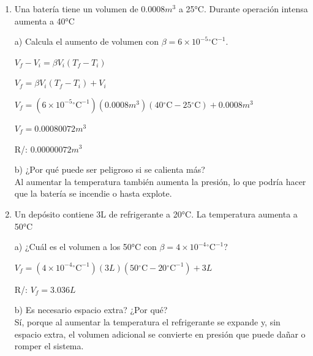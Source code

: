 \documentclass[a4paper, 11pt]{article}
\newcommand{\Pspace}{0.5cm}
\newcommand{\Aspace}{0.2cm}
\begin{document}
\begin{enumerate}
    \vspace{\Pspace}
    \item Una batería tiene un volumen de 0.0008$m^{3}$ a 25°C. Durante operación intensa aumenta a 40°C \par
        \vspace{\Aspace} \par
        a) Calcula el aumento de volumen con $\beta = 6 \times 10^{-5}\mathrm{^\circ C^{-1}}$.
        \\ { \color{azul} 
            $V_{f} - V_{i} = \beta V_{i} (T_{f} - T_{i})$ \par
            $V_{f} = \beta V_{i} (T_{f} - T_{i}) + V_{i}$ \par
            $V_{f} = (6 \times 10^{-5}\mathrm{^\circ C^{-1}})(0.0008m^{3})(40 \mathrm{^\circ C} - 25 \mathrm{^\circ C}) + 0.0008m^{3}$ \par
            $V_{f} = 0.00080072m^{3}$ \par
            R/: $0.00000072m^3$
        }

        \vspace{\Aspace} \par
        b) ¿Por qué puede ser peligroso si se calienta más?
        \\ { \color{azul} 
            Al aumentar la temperatura también aumenta la presión, lo que podría hacer que la batería se incendie o hasta explote.
        }



    \vspace{\Pspace}
    \item Un depósito contiene 3L de refrigerante a 20°C. La temperatura aumenta a 50°C \par
        \vspace{\Aspace} \par
        a) ¿Cuál es el volumen a los 50°C con $\beta = 4 \times 10^{-4}\mathrm{^\circ C^{-1}}$?
        \\ { \color{azul} 
            $V_{f} = (4 \times 10^{-4}\mathrm{^\circ C^{-1}})(3L)(50 \mathrm{^\circ C} - 20 \mathrm{^\circ C^{-1}}) + 3L$ \par
            R/: $V_{f} = 3.036L$
        }

        \vspace{\Aspace} \par
        b) Es necesario espacio extra? ¿Por qué?
        \\ { \color{azul} 
            Sí, porque al aumentar la temperatura el refrigerante se expande y, sin espacio extra, el volumen adicional se convierte en presión que puede dañar o romper el sistema.
        }
    \end{enumerate}
\end{document}
